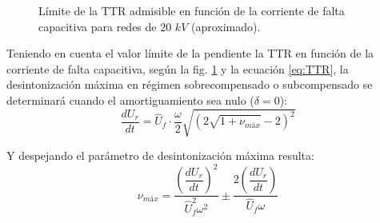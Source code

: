             \begin{figure}[H]
                \centering
                \caption{Límite de la TTR admisible en función de la corriente de falta capacitiva para redes de $20\textit{ kV}$ (aproximado).}
                \label{fig:limiteTTR}
            \end{figure}

            Teniendo en cuenta el valor límite de la pendiente la TTR en función de la corriente de falta capacitiva, según la fig. \ref{fig:limiteTTR} y la ecuación \eqref{eq:TTR}, la desintonización máxima en régimen sobrecompensado o subcompensado se determinará cuando el amortiguamiento sea nulo ($\delta=0$):
            \begin{equation}
                \dfrac{dU_\textit{r}}{dt} = \hat U_\textit{f}\cdot \dfrac{\omega}{2}\sqrt{\left(2\sqrt{1+\nu_\textit{máx}}-2\right)^2}
            \end{equation}

            Y despejando el parámetro de desintonización máxima resulta:
            \begin{equation}
                \nu_\textit{máx} = \dfrac{\left(\dfrac{dU_\textit{r}}{dt}\right)^2}{\hat U_\textit{f}^2\omega^2}\pm\dfrac{2\left(\dfrac{dU_\textit{r}}{dt}\right)}{\hat U_\textit{f}\omega}
            \end{equation}


